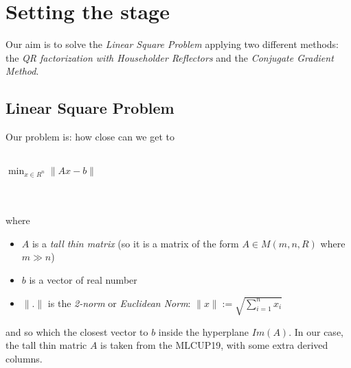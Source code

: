\documentclass{article}
\begin{document}
\section{Setting the stage}
Our aim is to solve the
\textit{Linear Square Problem}
applying two different methods: the
\textit{QR factorization with Householder Reflectors} and the
\textit{Conjugate Gradient Method}.

\subsection{Linear Square Problem}
Our problem is: how close can we get to \\\\
\centerline{$\min_{x \in R^n}\|Ax-b\|$} \\\\
where
\begin{itemize}
	\item $A$ is a \textit{tall thin matrix} (so it is a matrix of the form $A\in M(m, n, R)$ where $m \gg n$)
	\item $b$ is a vector of real number
	\item $\|.\|$ is the \textit{2-norm} or \textit{Euclidean Norm}: $\|x\| := \sqrt{\sum_{i=1}^n x_i}$
\end{itemize}
and so which the closest vector to $b$ inside the hyperplane $Im(A)$.
In our case, the tall thin matric $A$ is taken from the MLCUP19, with some extra derived columns.
\end{document}
